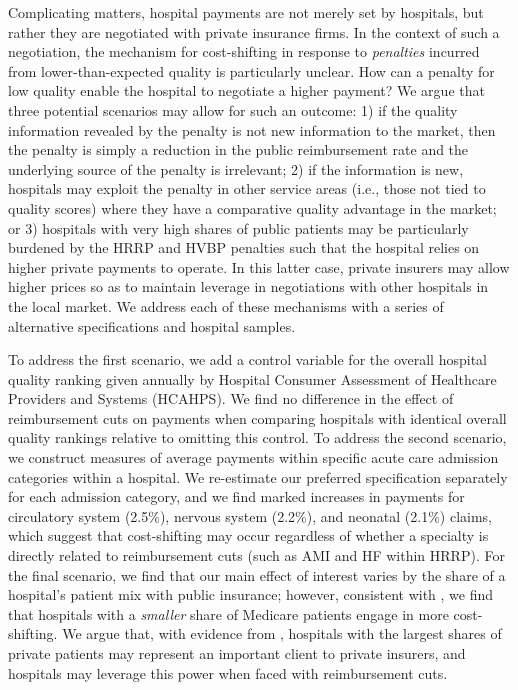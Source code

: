 \documentclass[12pt]{article}
\begin{document}
Complicating matters, hospital payments are not merely set by hospitals, but rather they are negotiated with private insurance firms. In the context of such a negotiation, the mechanism for cost-shifting in response to \textit{penalties} incurred from lower-than-expected quality is particularly unclear. How can a penalty for low quality enable the hospital to negotiate a higher payment? We argue that three potential scenarios may allow for such an outcome: 1) if the quality information revealed by the penalty is not new information to the market, then the penalty is simply a reduction in the public reimbursement rate and the underlying source of the penalty is irrelevant; 2) if the information is new, hospitals may exploit the penalty in other service areas (i.e., those not tied to quality scores) where they have a comparative quality advantage in the market; or 3) hospitals with very high shares of public patients may be particularly burdened by the HRRP and HVBP penalties such that the hospital relies on higher private payments to operate. In this latter case, private insurers may allow higher prices so as to maintain leverage in negotiations with other hospitals in the local market. We address each of these mechanisms with a series of alternative specifications and hospital samples.

To address the first scenario, we add a control variable for the overall hospital quality ranking given annually by Hospital Consumer Assessment of Healthcare Providers and Systems (HCAHPS).  We find no difference in the effect of reimbursement cuts on payments when comparing hospitals with identical overall quality rankings relative to omitting this control.  To address the second scenario, we construct measures of average payments within specific acute care admission categories within a hospital.  We re-estimate our preferred specification separately for each admission category, and we find marked increases in payments for circulatory system (2.5$\%$), nervous system (2.2$\%$), and neonatal (2.1$\%$) claims, which suggest that cost-shifting may occur regardless of whether a specialty is directly related to reimbursement cuts (such as AMI and HF within HRRP).  For the final scenario, we find that our main effect of interest varies by the share of a hospital's patient mix with public insurance; however, consistent with \cite{wu2010}, we find that hospitals with a \textit{smaller} share of Medicare patients engage in more cost-shifting.  We argue that, with evidence from \citet{wu2010}, hospitals with the largest shares of private patients may represent an important client to private insurers, and hospitals may leverage this power when faced with reimbursement cuts.  
\end{document}
